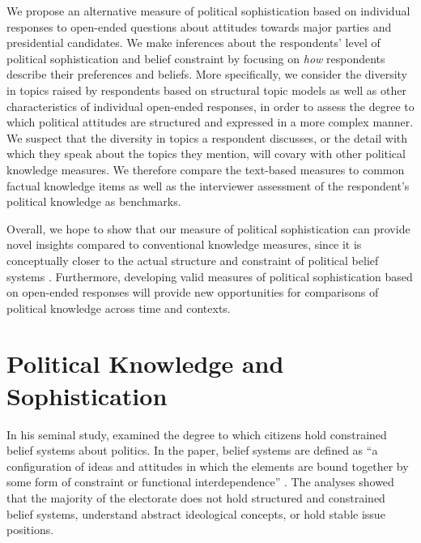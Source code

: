 \documentclass[12pt]{article}
\begin{document}
We propose an alternative measure of political sophistication based on individual responses to open-ended questions about attitudes towards major parties and presidential candidates. We make inferences about the respondents' level of political sophistication and belief constraint by focusing on \textit{how} respondents describe their preferences and beliefs. More specifically, we consider the diversity in topics raised by respondents based on structural topic models \citep{roberts2014structural} as well as other characteristics of individual open-ended responses, in order to assess the degree to which political attitudes are structured and expressed in a more complex manner. We suspect that the diversity in topics a respondent discusses, or the detail with which they speak about the topics they mention, will covary with other political knowledge measures. We therefore compare the text-based measures to common factual knowledge items as well as the interviewer assessment of the respondent's political knowledge as benchmarks.

Overall, we hope to show that our measure of political sophistication can provide novel insights compared to conventional knowledge measures, since it is conceptually closer to the actual structure and constraint of political belief systems \citet[see for example][]{tetlock1983cognitive,luskin1987measuring}. Furthermore, developing valid measures of political sophistication based on open-ended responses will provide new opportunities for comparisons of political knowledge across time and contexts.


\section{Political Knowledge and Sophistication}

In his seminal study, \citet{converse1964nature} examined the degree to which citizens hold constrained belief systems about politics. In the paper, belief systems are defined as ``a configuration of ideas and attitudes in which the elements are bound together by some form of constraint or functional interdependence'' \citep[207]{converse1964nature}. The analyses showed that the majority of the electorate does not hold structured and constrained belief systems, understand abstract ideological concepts, or hold stable issue positions. 
\end{document}
